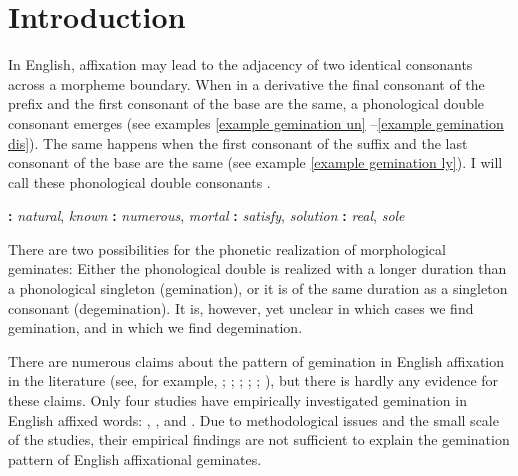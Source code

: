 \chapter{Introduction} \label{Introduction}



In English, affixation may lead to the adjacency of two identical consonants across a morpheme boundary. When in a derivative the final consonant of the prefix and the first consonant of the base are the same, a phonological double consonant emerges (see examples \ref{example gemination un} --\ref{example gemination dis}). The same happens when the first consonant of the suffix and the last consonant of the base are the same (see example \ref{example gemination ly}). I will call these phonological double consonants .


\begin{exe} 
	\ex \label{example gemination un} \textbf{:} \hspace*{1cm}\textit{natural}, \textit{known}
	\ex \label{example gemination in} \textbf{:} \hspace*{1cm} \textit{numerous}, \textit{mortal}
	\ex \label{example gemination dis} \textbf{:}  \hspace*{1cm}\textit{satisfy}, \textit{solution}
	\ex \label{example gemination ly} \textbf{:}  \hspace*{1.2cm}\textit{real}, \textit{sole}
\end{exe}

 There are two possibilities for the phonetic realization of morphological geminates: Either the phonological double is realized with a longer duration than a phonological singleton (gemination), or it is of the same duration as a singleton consonant (degemination). It is, however, yet unclear in which cases we find gemination, and in which we find degemination.
 
There are numerous claims about the pattern of gemination in English affixation in the literature (see, for example, \citealt[141]{Wijk.1966}; \citealt[255]{OConnor.1973}; \citealt[18]{Mohanan.1986}; \citealt[251]{Ladefoged.1993}; \citealt{Roach.2011,Wells.2008}; \citealt[1055 f.]{CohenGoldberg.2013}), but there is hardly any evidence for these claims. %
Only four studies have empirically investigated gemination in English affixed words: \cite{Kaye.2005}, \cite{Oh.2012}, \cite{Oh.2013} and \cite{Kotzor.2016}. Due to methodological issues and the small scale of the studies, their empirical findings are not sufficient to explain the gemination pattern of English affixational geminates.



